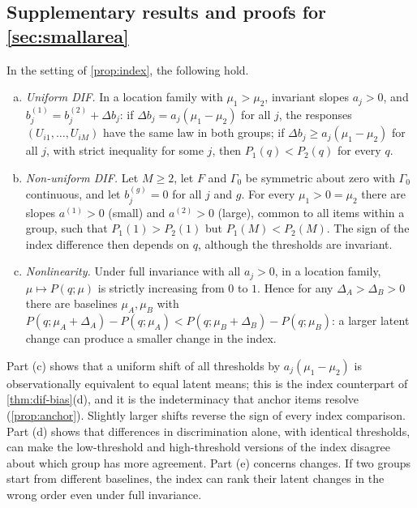 \subsection{Supplementary results and proofs for \texorpdfstring{\cref{sec:smallarea}}{Section 6}}\label{app:pd-smallarea}

\begin{proposition}\label{prop:index-dif}
In the setting of \cref{prop:index}, the following hold.
\begin{enumerate}[(a),start=3]
  \item \emph{Uniform DIF.} In a location family with $\mu_1>\mu_2$, invariant slopes $a_j>0$, and $b_j^{(1)}=b_j^{(2)}+\Delta b_j$: if $\Delta b_j=a_j(\mu_1-\mu_2)$ for all $j$, the responses $(U_{i1},\dots,U_{iM})$ have the same law in both groups; if $\Delta b_j\ge a_j(\mu_1-\mu_2)$ for all $j$, with strict inequality for some $j$, then $P_1(q)<P_2(q)$ for every $q$.
  \item \emph{Non-uniform DIF.} Let $M\ge2$, let $F$ and $\Gamma_0$ be symmetric about zero with $\Gamma_0$ continuous, and let $b_j^{(g)}=0$ for all $j$ and $g$. For every $\mu_1>0=\mu_2$ there are slopes $a^{(1)}>0$ (small) and $a^{(2)}>0$ (large), common to all items within a group, such that $P_1(1)>P_2(1)$ but $P_1(M)<P_2(M)$. The sign of the index difference then depends on $q$, although the thresholds are invariant.
  \item \emph{Nonlinearity.} Under full invariance with all $a_j>0$, in a location family, $\mu\mapsto P(q;\mu)$ is strictly increasing from $0$ to $1$. Hence for any $\Delta_A>\Delta_B>0$ there are baselines $\mu_A,\mu_B$ with $P(q;\mu_A+\Delta_A)-P(q;\mu_A)<P(q;\mu_B+\Delta_B)-P(q;\mu_B)$: a larger latent change can produce a smaller change in the index.
\end{enumerate}
\end{proposition}

Part (c) shows that a uniform shift of all thresholds by $a_j(\mu_1-\mu_2)$ is observationally equivalent to equal latent means; this is the index counterpart of \cref{thm:dif-bias}(d), and it is the indeterminacy that anchor items resolve (\cref{prop:anchor}). Slightly larger shifts reverse the sign of every index comparison. Part (d) shows that differences in discrimination alone, with identical thresholds, can make the low-threshold and high-threshold versions of the index disagree about which group has more agreement. Part (e) concerns changes. If two groups start from different baselines, the index can rank their latent changes in the wrong order even under full invariance.

